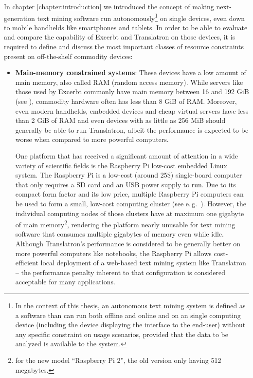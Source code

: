 \documentclass[a4paper, 12pt, twoside, reqn]{report}
\numberwithin{figure}{chapter}
\newtheorem[L]{boxedDefinition}{Definition}
\newtheorem[L]{boxedExample}{Example}
\newcommand{\eg}{e.\,g.\ }
\begin{document}
In chapter \ref{chapter:introduction} we introduced the concept of making next-generation text mining software run autonomously\footnote{In the context of this thesis, an autonomous text mining system is defined as a software than can run both offline and online and on an single computing device (including the device displaying the interface to the end-user) without any specific constraint on usage scenarios, provided that the data to be analyzed is available to the system.} on single devices, even down to mobile handhelds like smartphones and tablets. In order to be able to evaluate and compare the capability of Excerbt and Translatron on those devices, it is required to define and discuss the most important classes of resource constraints present on off-the-shelf commodity devices:

\begin{itemize}
  \item \textbf{Main-memory constrained systems}: These devices have a low amount of main memory, also called RAM (random access memory). While servers like those used by Excerbt commonly have main memory between 16 and 192 GiB (see \cite[figure 4.3]{wachinger2013next}), commodity hardware often has less than 8 GiB of RAM. Moreover, even modern handhelds, embedded devices and cheap virtual servers have less than 2 GiB of RAM and even devices with as little as 256 MiB should generally be able to run Translatron, albeit the performance is expected to be worse when compared to more powerful computers.
  
  One platform that has received a significant amount of attention in a wide variety of scientific fields is the Raspberry Pi low-cost embedded Linux system. The Raspberry Pi is a low-cost (around 25\$) single-board computer that only requires a SD card and an USB power supply to run. Due to its compact form factor and its low price, multiple Raspberry Pi computers can be used to form a small, low-cost computing cluster (see \eg\hspace{-.2em}\cite{cox2014iridis}). However, the individual computing nodes of those clusters have at maximum one gigabyte of main memory\footnote{for the new model ``Raspberry Pi 2'', the old version only having 512 megabytes.}, rendering the platform nearly unusable for text mining software that consumes multiple gigabytes of memory even while idle. Although Translatron's performance is considered to be generally better on more powerful computers like notebooks, the Raspberry Pi allows cost-efficient local deployment of a web-based text mining system like Translatron -- the performance penalty inherent to that configuration is considered acceptable for many applications.
  

\end{itemize}
\end{document}
